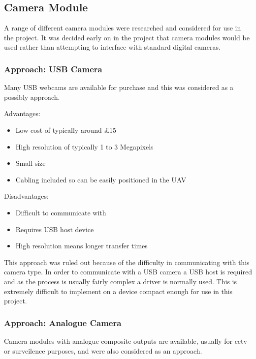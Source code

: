 \subsection{Camera Module}
\label{sec:John_options}

A range of different camera modules were researched and considered for use in the project. It was decided early on in the project that camera modules would be used rather than attempting to interface with standard digital cameras.

\subsubsection{Approach: USB Camera}
\label{sec:USB_option}
Many USB webcams are available for purchase and this was considered as a possibly approach.

Advantages:
      \begin{itemize}
         \item Low cost of typically around £15
         \item High resolution of typically 1 to 3 Megapixels
		 \item Small size
		 \item Cabling included so can be easily positioned in the UAV
     \end{itemize}

Disadvantages:
     \begin{itemize}
        \item Difficult to communicate with
        \item Requires USB host device
		\item High resolution means longer transfer times
     \end{itemize}

This approach was ruled out because of the difficulty in communicating with this camera type. In order to communicate with a USB camera a USB host is required and as the process is usually fairly complex a driver is normally used. This is extremely difficult to implement on a device compact enough for use in this project.

\subsubsection{Approach: Analogue Camera}
\label{sec:Analog_option}
Camera modules with analogue composite outputs are available, usually for cctv or surveilence purposes, and were also considered as an approach.

